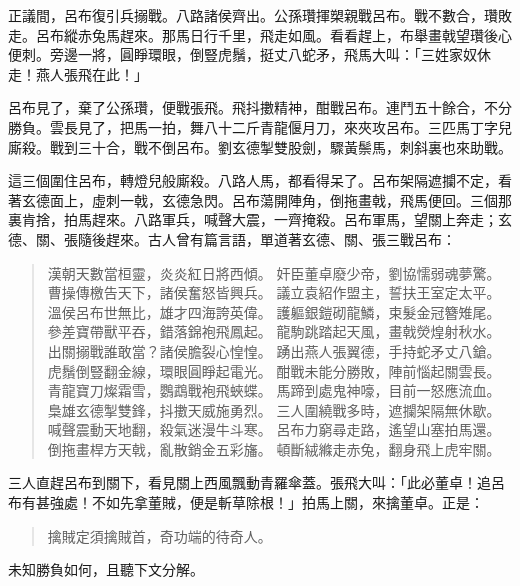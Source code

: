 正議間，呂布復引兵搦戰。八路諸侯齊出。公孫瓚揮槊親戰呂布。戰不數合，瓚敗走。呂布縱赤兔馬趕來。那馬日行千里，飛走如風。看看趕上，布舉畫戟望瓚後心便刺。旁邊一將，圓睜環眼，倒豎虎鬚，挺丈八蛇矛，飛馬大叫：「三姓家奴休走！燕人張飛在此！」

呂布見了，棄了公孫瓚，便戰張飛。飛抖擻精神，酣戰呂布。連鬥五十餘合，不分勝負。雲長見了，把馬一拍，舞八十二斤青龍偃月刀，來夾攻呂布。三匹馬丁字兒廝殺。戰到三十合，戰不倒呂布。劉玄德掣雙股劍，驟黃鬃馬，刺斜裏也來助戰。

這三個圍住呂布，轉燈兒般廝殺。八路人馬，都看得呆了。呂布架隔遮攔不定，看著玄德面上，虛刺一戟，玄德急閃。呂布蕩開陣角，倒拖畫戟，飛馬便回。三個那裏肯捨，拍馬趕來。八路軍兵，喊聲大震，一齊掩殺。呂布軍馬，望關上奔走；玄德、關、張隨後趕來。古人曾有篇言語，單道著玄德、關、張三戰呂布：

\begin{quote}
漢朝天數當桓靈，炎炎紅日將西傾。
奸臣董卓廢少帝，劉協懦弱魂夢驚。
曹操傳檄告天下，諸侯奮怒皆興兵。
議立袁紹作盟主，誓扶王室定太平。
溫侯呂布世無比，雄才四海誇英偉。
護軀銀鎧砌龍鱗，束髮金冠簪雉尾。
參差寶帶獸平吞，錯落錦袍飛鳳起。
龍駒跳踏起天風，畫戟熒煌射秋水。
出關搦戰誰敢當？諸侯膽裂心惶惶。
踴出燕人張翼德，手持蛇矛丈八鎗。
虎鬚倒豎翻金線，環眼圓睜起電光。
酣戰未能分勝敗，陣前惱起關雲長。
青龍寶刀燦霜雪，鸚鵡戰袍飛蛺蝶。
馬蹄到處鬼神嚎，目前一怒應流血。
梟雄玄德掣雙鋒，抖擻天威施勇烈。
三人圍繞戰多時，遮攔架隔無休歇。
喊聲震動天地翻，殺氣迷漫牛斗寒。
呂布力窮尋走路，遙望山塞拍馬還。
倒拖畫桿方天戟，亂散銷金五彩旛。
頓斷絨縧走赤兔，翻身飛上虎牢關。
\end{quote}

三人直趕呂布到關下，看見關上西風飄動青羅傘蓋。張飛大叫：「此必董卓！追呂布有甚強處！不如先拿董賊，便是斬草除根！」拍馬上關，來擒董卓。正是：

\begin{quote}
擒賊定須擒賊首，奇功端的待奇人。
\end{quote}

未知勝負如何，且聽下文分解。
